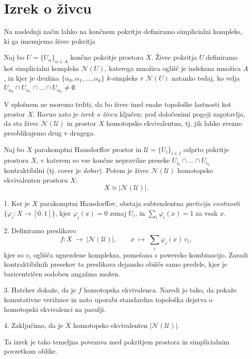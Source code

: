 \section{Izrek o živcu}

Na naslednji način lahko na končnem pokritju definiramo simplicialni kompleks, ki ga imenujemo živec pokritja

\begin{definicija}
Naj bo $U = \{U_\alpha\}_{\alpha \in A}$ končno pokritje prostora $X$. Živec pokritja $U$ definiramo kot simplicialni kompleks $\mathcal{N}(U)$, katerega množica oglišč je indeksna množica $A$, in kjer je družina $\{\alpha_0, \alpha_1, \dots, \alpha_k\}$ $k$-simpleks v $\mathcal{N}(U)$ natanko tedaj, ko velja $U_{\alpha_0} \cap U_{\alpha_1} \cap \dots \cap U_{\alpha_k} \ne \emptyset$.
\end{definicija}

V splošnem ne moremo trditi, da bo živec imel enake topološke lastnosti kot prostor \( X \). Ravno zato je \textit{izrek o živcu} ključen: pod določenimi pogoji zagotavlja, da sta živec \( \mathcal{N}(\mathcal{U}) \) in prostor \( X \) homotopsko ekvivalentna, tj. jih lahko zvezno preoblikujemo drug v drugega.

\begin{izrek}
Naj bo \(X\) parakomptni Hausdorffov prostor in \(\mathcal{U} = \{U_i\}_{i\in I}\) odprto pokritje prostora \(X\), v katerem so vse končne nepravilne preseke \(U_{i_0}\cap\dots\cap U_{i_k}\) kontraktibilni (tj. cover je \emph{dobar}). Potem je živec \(\mathcal{N}(\mathcal{U})\) homotopsko ekvivalenten prostoru \(X\):
\[
X \simeq \lvert\mathcal{N}(\mathcal{U})\rvert.
\]
\end{izrek}

\begin{dokaz}
1. Ker je \(X\) parakomptni Hausdorffov, obstaja subtendentna \emph{particija enotnosti} \(\{\varphi_i: X\to[0,1]\}\), kjer \(\varphi_i(x)=0\) zunaj \(U_i\), in \(\sum_i\varphi_i(x)=1\) za vsak \(x\).

2. Definiramo preslikavo
\[
f: X \;\longrightarrow\; \lvert\mathcal{N}(\mathcal{U})\rvert,  
\qquad
x \;\longmapsto\; \sum_i \varphi_i(x)\,v_i,
\]
kjer so \(v_i\) oglišča ugnezdene kompleksa, pomešana s powersko kombinacijo. Zaradi kontraktibilnih presekov ta preslikava dejansko obišče samo predele, kjer je baricentričen sodoben angažma možen.

3. Hatcher dokaže, da je \(f\) homotopska ekvivalenca. Naredi jo tako, da pokaže komutativne verižnice in nato uporabi standardna topološka dejstva o homotopski ekvivalenci na pasulji.

4. Zaključimo, da je \(X\) homotopsko ekvivalenten \(\lvert\mathcal{N}(\mathcal{U})\rvert\).

Ta izrek je tako temeljna povezava med pokritjem prostora in simplicialnim povzetkom oblike.
\end{dokaz}


